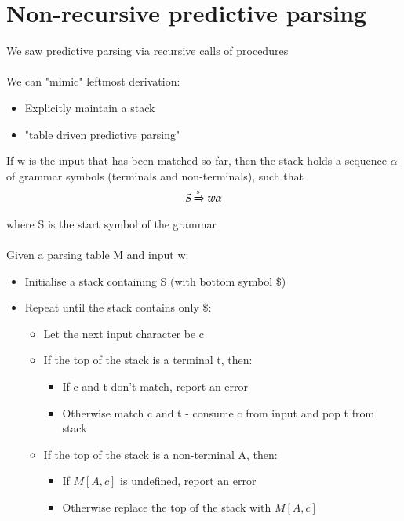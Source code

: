 \documentclass{article}[18pt]
\begin{document}
\section{Non-recursive predictive parsing}
We saw predictive parsing via recursive calls of procedures\\
\\
We can "mimic" leftmost derivation:
\begin{itemize}
	\item Explicitly maintain a stack
	\item "table driven predictive parsing"
\end{itemize}
If w is the input that has been matched so far, then the stack holds a sequence $\alpha$ of grammar symbols (terminals and non-terminals), such that
$$S\xRightarrow{*}w\alpha$$
where S is the start symbol of the grammar\\
\\
Given a parsing table M and input w:
\begin{itemize}
	\item Initialise a stack containing S (with bottom symbol \$)
	\item Repeat until the stack contains only \$:
	\begin{itemize}
		\item Let the next input character be c
		\item If the top of the stack is a terminal t, then:
		\begin{itemize}
			\item If c and t don't match, report an error
			\item Otherwise match c and t  - consume c from input and pop t from stack
		\end{itemize}
		\item If the top of the stack is a non-terminal A, then:
		\begin{itemize}
			\item If $M[A,c]$ is undefined, report an error
			\item Otherwise replace the top of the stack with $M[A,c]$
		\end{itemize}
	\end{itemize}
\end{itemize}
\end{document}
